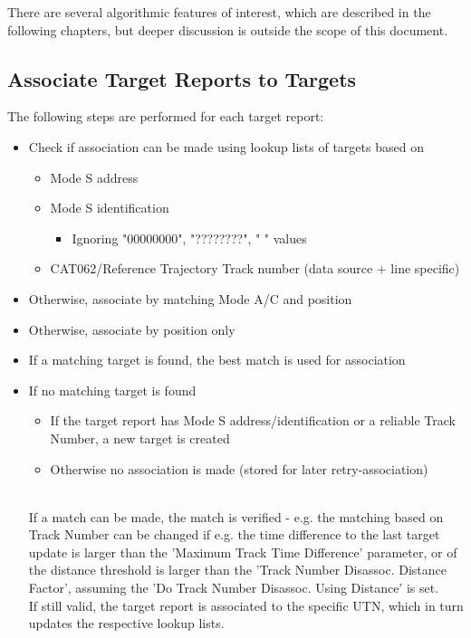 There are several algorithmic features of interest, which are described in the following chapters, but deeper discussion is outside the scope of this document.

\subsection{Associate Target Reports to Targets}

The following steps are performed for each target report:
\begin{itemize}
\item Check if association can be made using lookup lists of targets based on
\begin{itemize}
\item Mode S address
\item Mode S identification
\begin{itemize}
\item Ignoring "00000000", "????????", "        " values
\end{itemize}
\item CAT062/Reference Trajectory Track number (data source + line specific)
\end{itemize}
\item Otherwise, associate by matching Mode A/C and position
\item Otherwise, associate by position only
\item If a matching target is found, the best match is used for association
\item If no matching target is found
\begin{itemize}
\item If the target report has Mode S address/identification or a reliable Track Number, a new target is created
\item Otherwise no association is made (stored for later retry-association)
\end{itemize}
\ \\

If a match can be made, the match is verified - e.g. the matching based on Track Number can be changed if e.g. the time difference to the last target update is larger than the 'Maximum Track Time Difference' parameter, or of the distance threshold is larger than the 'Track Number Disassoc. Distance Factor', assuming the 'Do Track Number Disassoc. Using Distance' is set. \\

If still valid, the target report is associated to the specific UTN, which in turn updates the respective lookup lists.


\end{itemize}

